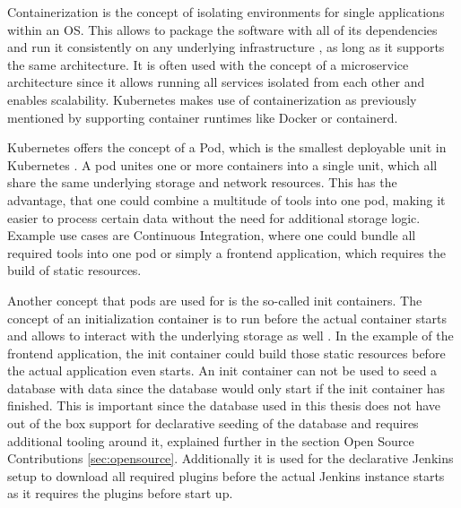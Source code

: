 Containerization is the concept of isolating environments for single applications within an OS. This allows to package the software with all of its dependencies and run it consistently on any underlying infrastructure \cite{containerization}, as long as it supports the same architecture. It is often used with the concept of a microservice architecture since it allows running all services isolated from each other and enables scalability. Kubernetes makes use of containerization as previously mentioned by supporting container runtimes like Docker or containerd.

Kubernetes offers the concept of a Pod, which is the smallest deployable unit in Kubernetes \cite{pods}. A pod unites one or more containers into a single unit, which all share the same underlying storage and network resources. This has the advantage, that one could combine a multitude of tools into one pod, making it easier to process certain data without the need for additional storage logic. Example use cases are Continuous Integration, where one could bundle all required tools into one pod or simply a frontend application, which requires the build of static resources.

Another concept that pods are used for is the so-called init containers. The concept of an initialization container is to run before the actual container starts and allows to interact with the underlying storage as well \cite{init}. In the example of the frontend application, the init container could build those static resources before the actual application even starts. An init container can not be used to seed a database with data since the database would only start if the init container has finished. This is important since the database used in this thesis does not have out of the box support for declarative seeding of the database and requires additional tooling around it, explained further in the section Open Source Contributions \ref{sec:opensource}. Additionally it is used for the declarative Jenkins setup to download all required plugins before the actual Jenkins instance starts as it requires the plugins before start up.

